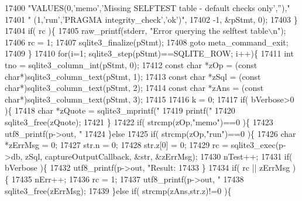 \begin{DoxyCode}
{{{{{{{{{{{{{{{{{{{{{{{{{{{{{{{{{{{{{{{{{{{{{{{{{{{{{{{{{{{{{{{{{{{{{{{{{{{{{{{{{{{{{{{{{{{{{{{{{{{{17400           \textcolor{stringliteral}{"VALUES(0,'memo','Missing SELFTEST table - default checks only',''),"}
17401           \textcolor{stringliteral}{"      (1,'run','PRAGMA integrity\_check','ok')"},
17402           -1, &pStmt, 0);
17403       \}
17404       \textcolor{keywordflow}{if}( rc )\{
17405         raw_printf(stderr, \textcolor{stringliteral}{"Error querying the selftest table\(\backslash\)n"});
17406         rc = 1;
17407         sqlite3_finalize(pStmt);
17408         \textcolor{keywordflow}{goto} meta\_command\_exit;
17409       \}
17410       \textcolor{keywordflow}{for}(i=1; sqlite3_step(pStmt)==SQLITE_ROW; i++)\{
17411         \textcolor{keywordtype}{int} tno = sqlite3_column_int(pStmt, 0);
17412         \textcolor{keyword}{const} \textcolor{keywordtype}{char} *zOp = (\textcolor{keyword}{const} \textcolor{keywordtype}{char}*)sqlite3_column_text(pStmt, 1);
17413         \textcolor{keyword}{const} \textcolor{keywordtype}{char} *zSql = (\textcolor{keyword}{const} \textcolor{keywordtype}{char}*)sqlite3_column_text(pStmt, 2);
17414         \textcolor{keyword}{const} \textcolor{keywordtype}{char} *zAns = (\textcolor{keyword}{const} \textcolor{keywordtype}{char}*)sqlite3_column_text(pStmt, 3);
17415 
17416         k = 0;
17417         \textcolor{keywordflow}{if}( bVerbose>0 )\{
17418           \textcolor{keywordtype}{char} *zQuote = sqlite3_mprintf(\textcolor{stringliteral}{"%
17419           printf(\textcolor{stringliteral}{"%
17420           sqlite3_free(zQuote);
17421         \}
17422         \textcolor{keywordflow}{if}( strcmp(zOp,\textcolor{stringliteral}{"memo"})==0 )\{
17423           utf8_printf(p->out, \textcolor{stringliteral}{"%
17424         \}\textcolor{keywordflow}{else}
17425         \textcolor{keywordflow}{if}( strcmp(zOp,\textcolor{stringliteral}{"run"})==0 )\{
17426           \textcolor{keywordtype}{char} *zErrMsg = 0;
17427           str.n = 0;
17428           str.z[0] = 0;
17429           rc = sqlite3_exec(p->db, zSql, captureOutputCallback, &str, &zErrMsg);
17430           nTest++;
17431           \textcolor{keywordflow}{if}( bVerbose )\{
17432             utf8_printf(p->out, \textcolor{stringliteral}{"Result: %
17433           \}
17434           \textcolor{keywordflow}{if}( rc || zErrMsg )\{
17435             nErr++;
17436             rc = 1;
17437             utf8_printf(p->out, \textcolor{stringliteral}{"%
17438             sqlite3_free(zErrMsg);
17439           \}\textcolor{keywordflow}{else} \textcolor{keywordflow}{if}( strcmp(zAns,str.z)!=0 )\{
}}}}}}}}}}}}}}}}}}}}}}}}}}}}}}}}}}}}}}}}}}}}}}}}}}}}}}}}}}}}}}}}}}}}}}}}}}}}}}}}}}}}}}}}}}}}}}}}}}}}}}}}}
\end{DoxyCode}
